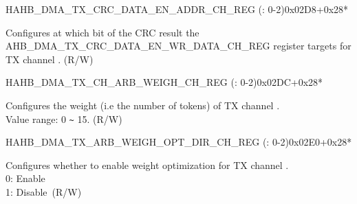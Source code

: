 \begin{register}{H}{AHB\_DMA\_TX\_CRC\_DATA\_EN\_ADDR\_CH\_REG (: 0-2)}{0x02D8+0x28*}\label{regdesc:AHBDMATXCRCDATAENADDRCHNREG}
%
\regnewline%
\begin{regdesc}\begin{reglist}
\label{fielddesc:AHBDMATXCRCDATAENADDRCHN}\item [AHB\_DMA\_TX\_CRC\_DATA\_EN\_ADDR\_CH\regindex{n}] Configures at which bit of the CRC result the AHB\_DMA\_TX\_CRC\_DATA\_EN\_WR\_DATA\_CH\_REG register targets for TX channel . (R/W)
\end{reglist}\end{regdesc}
\end{register}


\begin{register}{H}{AHB\_DMA\_TX\_CH\_ARB\_WEIGH\_CH\_REG (: 0-2)}{0x02DC+0x28*}\label{regdesc:AHBDMATXCHARBWEIGHCHNREG}
%
%
\regnewline%
\begin{regdesc}\begin{reglist}
\label{fielddesc:AHBDMATXCHARBWEIGHCHN}\item [AHB\_DMA\_TX\_CH\_ARB\_WEIGH\_CH\regindex{n}] Configures the weight (i.e the number of tokens) of TX channel .\\
Value range: 0 \verb+~+ 15. (R/W)
\end{reglist}\end{regdesc}
\end{register}


\begin{register}{H}{AHB\_DMA\_TX\_ARB\_WEIGH\_OPT\_DIR\_CH\_REG (: 0-2)}{0x02E0+0x28*}\label{regdesc:AHBDMATXARBWEIGHOPTDIRCHNREG}
%
%
\regnewline%
\begin{regdesc}\begin{reglist}
\label{fielddesc:AHBDMATXARBWEIGHOPTDIRCHN}\item [AHB\_DMA\_TX\_ARB\_WEIGH\_OPT\_DIR\_CH\regindex{n}] Configures whether to enable weight optimization for TX channel .\\
0: Enable\\
1: Disable\ (R/W)
\end{reglist}\end{regdesc}
\end{register}


